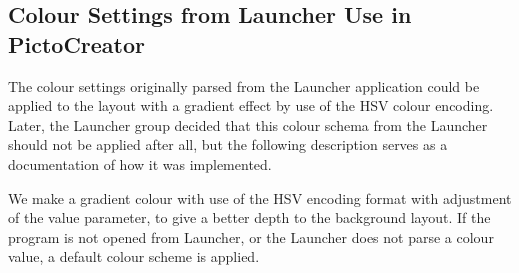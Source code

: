 \subsection{Colour Settings from Launcher Use in PictoCreator}
The colour settings originally parsed from the Launcher application could be applied to the layout with a gradient effect by use of the HSV colour encoding.
Later, the Launcher group decided that this colour schema from the Launcher should not be applied after all, but the following description serves as a documentation of how it was implemented.

We make a gradient colour with use of the HSV encoding format with adjustment of the value parameter, to give a better depth to the background layout.
If the program is not opened from Launcher, or the Launcher does not parse a colour value, a default colour scheme is applied.

